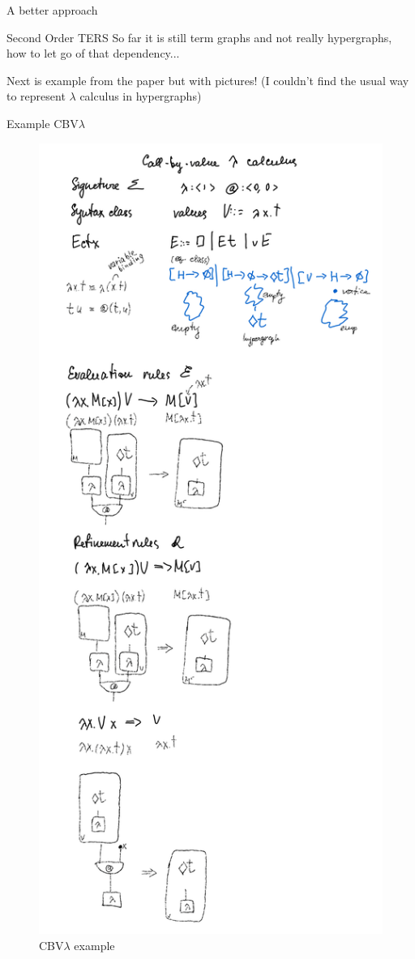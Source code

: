 \documentclass{article}
\theoremstyle{plain}
\theoremstyle{definition}
\begin{document}
\begin{section}{A better approach}
\begin{subsection}{Second Order TERS}
So far it is still term graphs and not really hypergraphs, how to let go of that dependency...

Next is example from the paper but with pictures! (I couldn't find the usual way to represent $\lambda$ calculus in hypergraphs)
\begin{subsubsection}{Example CBV$\lambda$}
\begin{figure}[H]
\hspace{-1.0cm}
\includegraphics[scale=0.7]{images/cbvl.png}
\caption{CBV$\lambda$ example}
\end{figure}

\end{subsubsection}

\end{subsection}

\end{section}
\end{document}
